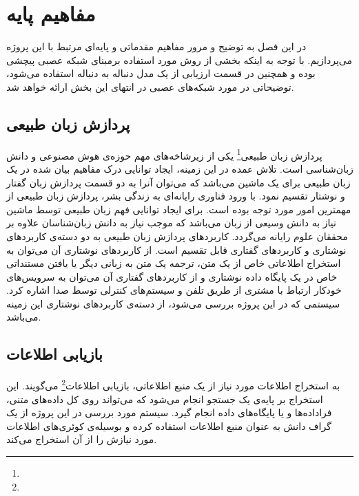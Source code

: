 \chapter{مفاهیم پایه}
در این فصل به توضیح و مرور مفاهیم مقدماتی و پایه‌ای مرتبط با این پروژه می‌پردازیم. با توجه به اینکه بخشی از روش مورد استفاده برمبنای شبکه عصبی پیچشی بوده و همچنین در قسمت ارزیابی از یک مدل دنباله به دنباله استفاده می‌شود، توضیحاتی در مورد شبکه‌های عصبی در انتهای این بخش ارائه خواهد شد.
\section{پردازش زبان طبیعی}
پردازش زبان طبيعی\footnote{} يکی از زيرشاخه‌های مهم حوزه‌ی هوش مصنوعی و دانش زبان‌شناسی‌ است. تلاش عمده در اين زمينه، ایجاد توانایی درک مفاهیم بیان شده در یک زبان طبیعی برای یک ماشین می‌باشد که می‌توان آنرا به دو قسمت پردازش زبان گفتار و نوشتار تقسیم نمود. با ورود فناوری رایانه‌ای به زندگی بشر، پردازش زبان طبیعی از مهمترین امور مورد توجه بوده است.
برای ایجاد توانایی فهم زبان طبیعی توسط ماشین نیاز به دانش وسیعی از زبان می‌باشد که موجب نیاز به دانش زبان‌شناسان علاوه بر محققان علوم رایانه می‌گردد.
کاربردهای پردازش زبان طبیعی به دو دسته‌ی کاربردهای نوشتاری و کاربردهای گفتاری قابل تقسیم است. از کاربردهای نوشتاری آن می‌توان به استخراج اطلاعاتی خاص از یک متن، ترجمه یک متن به زبانی دیگر یا یافتن مستنداتی خاص در یک پایگاه داده نوشتاری و از کاربردهای گفتاری آن می‌توان به سرویس‌های خودکار ارتباط با مشتری از طریق تلفن و سیستم‌های کنترلی توسط صدا اشاره کرد. سیستمی که در این پروژه بررسی می‌شود، از دسته‌ی کاربردهای نوشتاری این زمینه می‌باشد.
\section{بازیابی اطلاعات}
به استخراج اطلاعات مورد نیاز از یک منبع اطلاعاتی، بازیابی اطلاعات\footnote{} می‌گویند. این استخراج بر پایه‌ی یک جستجو انجام می‌شود که می‌تواند روی کل داده‌های متنی، فراداده‌ها و یا پایگاه‌های داده انجام گیرد. سیستم مورد بررسی در این پروژه از یک گراف دانش به عنوان منبع اطلاعات استفاده کرده و بوسیله‌ی کوئری‌های  اطلاعات مورد نیازش را از آن استخراج می‌کند.
